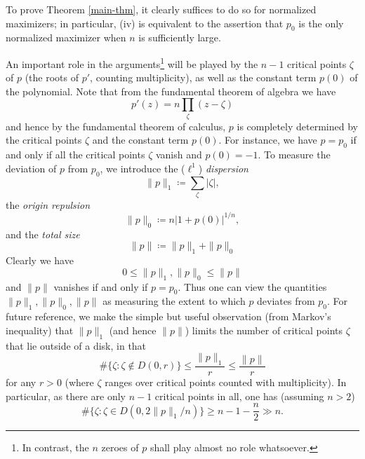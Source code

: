\documentclass[12pt]{amsart}
\begin{document}
To prove Theorem \ref{main-thm}, it clearly suffices to do so for normalized maximizers; in particular, (iv) is equivalent to the assertion that $p_0$ is the only normalized maximizer when $n$ is sufficiently large.

An important role in the arguments\footnote{In contrast, the $n$ zeroes of $p$ shall play almost no role whatsoever.} will be played by the $n-1$ critical points $\zeta$ of $p$ (the roots of $p'$, counting multiplicity), as well as the constant term $p(0)$ of the polynomial.  Note that from the fundamental theorem of algebra we have
\begin{equation}\label{pp-factor}
    p'(z) = n \prod_\zeta (z-\zeta)
\end{equation}
and hence by the fundamental theorem of calculus, $p$ is completely determined by the critical points $\zeta$ and the constant term $p(0)$.
For instance, we have $p=p_0$ if and only if all the critical points $\zeta$ vanish and $p(0)=-1$.  To measure the deviation of $p$ from $p_0$, we introduce the ($\ell^1$) \emph{dispersion}
\begin{equation}\label{semi-norm}
    \|p\|_1 \coloneqq \sum_\zeta |\zeta|,
\end{equation}
the \emph{origin repulsion}
\begin{equation}\label{origin-repulse}
    \|p\|_0 \coloneqq n |1 + p(0)|^{1/n},
\end{equation}
and the \emph{total size}
\begin{equation}\label{size-def}
    \|p\| \coloneqq \|p\|_1 + \|p\|_0
\end{equation}
Clearly we have
\begin{equation}\label{sdef}
    0 \leq \|p\|_1, \|p\|_0 \leq \|p\|
\end{equation}
and $\|p\|$ vanishes if and only if $p=p_0$.  Thus one can view the quantities $\|p\|_1, \|p\|_0, \|p\|$ as measuring the extent to which $p$ deviates from $p_0$.  For future reference, we make the simple but useful observation (from Markov's inequality) that $\|p\|_1$ (and hence $\|p\|$) limits the number of critical points $\zeta$ that lie outside of a disk, in that
\begin{equation}\label{markov}
    \# \{ \zeta: \zeta \notin D(0,r) \} \leq \frac{\|p\|_1}{r} \leq \frac{\|p\|}{r}
\end{equation}
for any $r>0$ (where $\zeta$ ranges over critical points counted with multiplicity).  In particular, as there are only $n-1$ critical points in all, one has (assuming $n>2$)
\begin{equation}\label{markov-many}
    \# \{ \zeta: \zeta \in D(0,2\|p\|_1/n) \} \geq n-1-\frac{n}{2} \gg n.
\end{equation}
\end{document}
